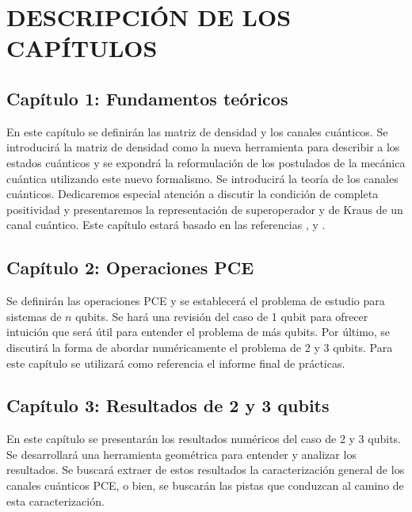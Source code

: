 \chapter{DESCRIPCIÓN DE LOS CAPÍTULOS}

\section*{Capítulo 1: Fundamentos teóricos}
En este capítulo se definirán las matriz de densidad y los canales cuánticos. 
Se introducirá la matriz de densidad como la nueva herramienta para 
describir a los estados cuánticos y se expondrá la reformulación de 
los postulados de la mecánica cuántica utilizando este nuevo formalismo.
Se introducirá la teoría de los canales cuánticos. Dedicaremos especial 
atención a discutir la condición de completa positividad y presentaremos 
la representación de superoperador y de Kraus de un canal cuántico.
Este capítulo estará basado en las referencias \cite{bengtsson_zyczkowski_2017},
\cite{nielsen_chuang_2011} y \cite{sakurai_napolitano_2017}.

\section*{Capítulo 2: Operaciones PCE}
Se definirán las operaciones PCE y se establecerá el problema de 
estudio para sistemas de $n$ qubits. Se hará una revisión del caso 
de 1 qubit para ofrecer intuición que será útil para entender el 
problema de más qubits. Por último, se discutirá la forma de 
abordar numéricamente el problema de 2 y 3 qubits. Para este
capítulo se utilizará como referencia el informe final de prácticas.

\section*{Capítulo 3: Resultados de 2 y 3 qubits}
En este capítulo se presentarán los resultados numéricos del 
caso de 2 y 3 qubits. Se desarrollará una herramienta geométrica 
para entender y analizar los resultados. Se buscará extraer de 
estos resultados la caracterización general de los canales cuánticos PCE,
o bien, se buscarán las pistas que conduzcan al camino de esta caracterización.

